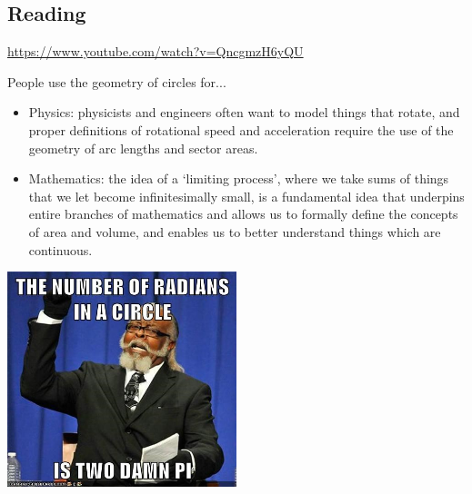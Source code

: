 



\subsection*{Reading}
\begin{center}
\begin{tcolorbox}[width=0.8\textwidth,colback={white},title={\textbf{Go and watch...}},colbacktitle=black,coltitle=white]
  \textcolor{black}{\url{https://www.youtube.com/watch?v=QncgmzH6yQU}}
\end{tcolorbox}
\end{center}

\begin{center}
\begin{tcolorbox}[width=0.8\textwidth,colback={white},title={\textbf{What's it good for?}},colbacktitle=MidnightBlue,coltitle=white]
  People use the geometry of circles for...
  \begin{itemize}
    \item Physics: physicists and engineers often want to model things that rotate, and proper definitions of rotational speed and acceleration
          require the use of the geometry of arc lengths and sector areas.
    \item Mathematics: the idea of a `limiting process', where we take sums of things that we let become infinitesimally small, is a fundamental
          idea that underpins entire branches of mathematics and allows us to formally define the concepts of area and volume, and enables us
          to better understand things which are continuous.
  \end{itemize}
\end{tcolorbox}
\end{center}

\begin{center}
  \includegraphics[width=0.5\textwidth]{trig1}
\end{center}

